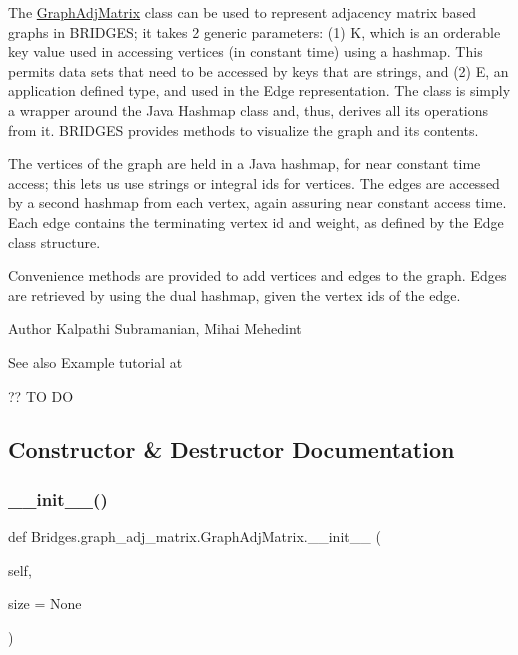 The \mbox{\hyperlink{class_bridges_1_1graph__adj__matrix_1_1_graph_adj_matrix}{Graph\+Adj\+Matrix}} class can be used to represent adjacency matrix based graphs in B\+R\+I\+D\+G\+ES; it takes 2 generic parameters\+: (1) K, which is an orderable key value used in accessing vertices (in constant time) using a hashmap. This permits data sets that need to be accessed by keys that are strings, and (2) E, an application defined type, and used in the Edge representation. The class is simply a wrapper around the Java Hashmap class and, thus, derives all its operations from it. B\+R\+I\+D\+G\+ES provides methods to visualize the graph and its contents.

The vertices of the graph are held in a Java hashmap, for near constant time access; this lets us use strings or integral ids for vertices. The edges are accessed by a second hashmap from each vertex, again assuring near constant access time. Each edge contains the terminating vertex id and weight, as defined by the Edge class structure.

Convenience methods are provided to add vertices and edges to the graph. Edges are retrieved by using the dual hashmap, given the vertex ids of the edge.

\begin{DoxyAuthor}{Author}
Kalpathi Subramanian, Mihai Mehedint
\end{DoxyAuthor}
\begin{DoxySeeAlso}{See also}
Example tutorial at 
\end{DoxySeeAlso}
?? TO DO 

\subsection{Constructor \& Destructor Documentation}
\mbox{\label{class_bridges_1_1graph__adj__matrix_1_1_graph_adj_matrix_a82b601ce68bdef2e35c3f92a76464243}} 
\subsubsection{\texorpdfstring{\+\_\+\+\_\+init\+\_\+\+\_\+()}{\_\_init\_\_()}}
{\footnotesize\ttfamily def Bridges.\+graph\+\_\+adj\+\_\+matrix.\+Graph\+Adj\+Matrix.\+\_\+\+\_\+init\+\_\+\+\_\+ (\begin{DoxyParamCaption}\item[{}]{self,  }\item[{}]{size = {\ttfamily None} }\end{DoxyParamCaption})}



